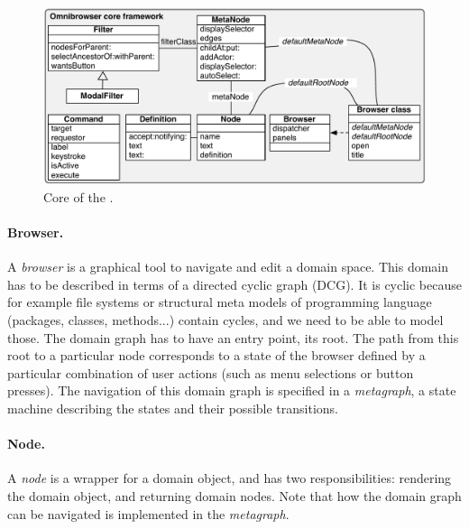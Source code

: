 \documentclass[a4paper,10pt,twoside]{book}
\begin{document}
\begin{figure}[!ht]
\begin{center}
\includegraphics[scale=0.59]{CoreOnly}
\caption{Core of the \obf. } 
\end{center}
\end{figure}

\paragraph{Browser.} A \emph{browser} is a graphical tool to navigate and edit a domain space. This domain has to be described in terms of a directed cyclic graph (DCG). It is cyclic because for example file systems or structural meta models of programming language (\ie packages, classes, methods...) contain cycles, and we need to be able to model those. The domain graph has to have an entry point, its root. The path from this root to a particular node corresponds to a state of the browser defined by a particular combination of user actions (such as menu selections or button presses).
The navigation of this domain graph is specified in a \emph{metagraph}, a state machine describing the states and their possible transitions.

\paragraph{Node.} A \emph{node} is a wrapper for a domain object, and has two responsibilities: rendering the domain object, and returning domain nodes. Note that how the domain graph can be navigated is implemented in the \emph{metagraph}.
\end{document}
